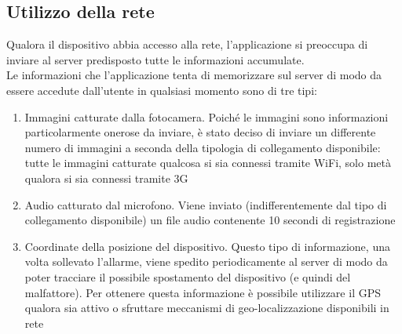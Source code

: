 \subsection{Utilizzo della rete}
Qualora il dispositivo abbia accesso alla rete, l'applicazione si preoccupa di inviare al server predisposto tutte le informazioni accumulate.\\
Le informazioni che l'applicazione tenta di memorizzare sul server di modo da essere accedute dall'utente in qualsiasi momento sono di tre tipi:
\begin{enumerate}
  \item Immagini catturate dalla fotocamera. Poiché le immagini sono informazioni particolarmente onerose da inviare, è stato deciso di inviare un differente numero di immagini a seconda della tipologia di collegamento disponibile: tutte le immagini catturate qualcosa si sia connessi tramite WiFi, solo metà qualora si sia connessi tramite 3G
  \item Audio catturato dal microfono. Viene inviato (indifferentemente dal tipo di collegamento disponibile) un file audio contenente 10 secondi di registrazione
  \item Coordinate della posizione del dispositivo. Questo tipo di informazione, una volta sollevato l'allarme, viene spedito periodicamente al server di modo da poter tracciare il possibile spostamento del dispositivo (e quindi del malfattore). Per ottenere questa informazione è possibile utilizzare il GPS qualora sia attivo o sfruttare meccanismi di geo-localizzazione disponibili in rete
\end{enumerate}

